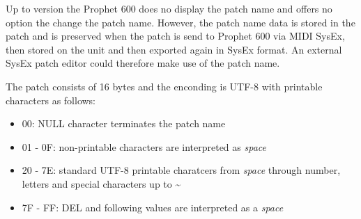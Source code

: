 Up to version \version the Prophet 600 does no display the patch name and offers no option the change the patch name. However, the patch name data is stored in the patch and is preserved when the patch is send to Prophet 600 via MIDI SysEx, then stored on the unit and then exported again in SysEx format. An external SysEx patch editor could therefore make use of the patch name.

The patch consists of 16 bytes and the enconding is UTF-8 with printable characters as follows:

\begin{itemize}
  \item 00: NULL character terminates the patch name
  \item 01 - 0F: non-printable characters are interpreted as \textit{space}
  \item 20 - 7E: standard UTF-8 printable charatcers from \textit{space} through number, letters and special characters up to \textasciitilde
  \item 7F - FF: DEL and following values are interpreted as a \textit{space}
\end{itemize}
 

